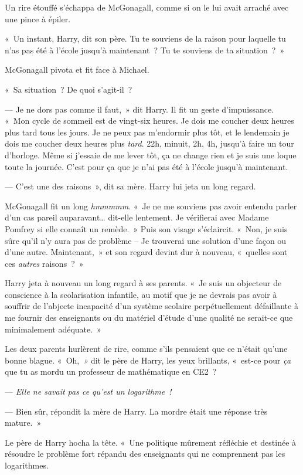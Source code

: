 Un rire étouffé s'échappa de McGonagall, comme si on le lui avait arraché avec une pince à épiler.

«~Un instant, Harry, dit son père. Tu te souviens de la raison pour laquelle tu n'as pas été à l'école jusqu'à maintenant~? Tu te souviens de ta situation~?~»

McGonagall pivota et fit face à Michael.

«~Sa situation~? De quoi s'agit-il~?

--- Je ne dors pas comme il faut,~» dit Harry. Il fit un geste d'impuissance. «~Mon cycle de sommeil est de vingt-six heures. Je dois me coucher deux heures plus tard tous les jours. Je ne peux pas m'endormir plus tôt, et le lendemain je dois me coucher deux heures plus \emph{tard}. 22h, minuit, 2h, 4h, jusqu'à faire un tour d'horloge. Même si j'essaie de me lever tôt, ça ne change rien et je suis une loque toute la journée. C'est pour ça que je n'ai pas été à l'école jusqu'à maintenant.

--- C'est une des raisons~», dit sa mère. Harry lui jeta un long regard.

McGonagall fit un long \emph{hmmmmm}. «~Je ne me souviens pas avoir entendu parler d'un cas pareil auparavant… dit-elle lentement. Je vérifierai avec Madame Pomfrey si elle connaît un remède.~» Puis son visage s'éclaircit. «~Non, je suis sûre qu'il n'y aura pas de problème -- Je trouverai une solution d'une façon ou d'une autre. Maintenant,~» et son regard devint dur à nouveau, «~quelles sont ces \emph{autres} raisons~?~»

Harry jeta à nouveau un long regard à ses parents. «~Je suis un objecteur de conscience à la scolarisation infantile, au motif que je ne devrais pas avoir à souffrir de l'abjecte incapacité d'un système scolaire perpétuellement défaillante à me fournir des enseignants ou du matériel d'étude d'une qualité ne serait-ce que minimalement adéquate.~»

Les deux parents hurlèrent de rire, comme s'ils pensaient que ce n'était qu'une bonne blague. «~Oh,\emph{~»} dit le père de Harry, les yeux brillants, «~est-ce pour \emph{ça} que tu as mordu un professeur de mathématique en CE2~?

--- \emph{Elle ne savait pas ce qu'est un logarithme~!}

--- Bien sûr, répondit la mère de Harry. La mordre était une réponse très mature.~»

Le père de Harry hocha la tête. «~Une politique mûrement réfléchie et destinée à résoudre le problème fort répandu des enseignants qui ne comprennent pas les logarithmes.

